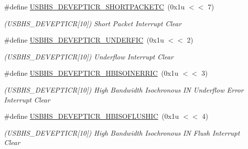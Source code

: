 \begin{DoxyCompactItemize}
\mbox{\label{group__SAMS70__USBHS_ga157a85d1247175cdabb46c823d30dcc7}} 
\#define \mbox{\hyperlink{group__SAMS70__USBHS_ga157a85d1247175cdabb46c823d30dcc7}{U\+S\+B\+H\+S\+\_\+\+D\+E\+V\+E\+P\+T\+I\+C\+R\+\_\+\+S\+H\+O\+R\+T\+P\+A\+C\+K\+E\+TC}}~(0x1u $<$$<$ 7)
\begin{DoxyCompactList}\small\item\em (U\+S\+B\+H\+S\+\_\+\+D\+E\+V\+E\+P\+T\+I\+CR\mbox{[}10\mbox{]}) Short Packet Interrupt Clear \end{DoxyCompactList}\item 
\mbox{\label{group__SAMS70__USBHS_ga62fa84e30ca3a2de864ec235f99b1fb2}} 
\#define \mbox{\hyperlink{group__SAMS70__USBHS_ga62fa84e30ca3a2de864ec235f99b1fb2}{U\+S\+B\+H\+S\+\_\+\+D\+E\+V\+E\+P\+T\+I\+C\+R\+\_\+\+U\+N\+D\+E\+R\+F\+IC}}~(0x1u $<$$<$ 2)
\begin{DoxyCompactList}\small\item\em (U\+S\+B\+H\+S\+\_\+\+D\+E\+V\+E\+P\+T\+I\+CR\mbox{[}10\mbox{]}) Underflow Interrupt Clear \end{DoxyCompactList}\item 
\mbox{\label{group__SAMS70__USBHS_ga545da4a14b5d0a1116acefa6b9f9ef06}} 
\#define \mbox{\hyperlink{group__SAMS70__USBHS_ga545da4a14b5d0a1116acefa6b9f9ef06}{U\+S\+B\+H\+S\+\_\+\+D\+E\+V\+E\+P\+T\+I\+C\+R\+\_\+\+H\+B\+I\+S\+O\+I\+N\+E\+R\+R\+IC}}~(0x1u $<$$<$ 3)
\begin{DoxyCompactList}\small\item\em (U\+S\+B\+H\+S\+\_\+\+D\+E\+V\+E\+P\+T\+I\+CR\mbox{[}10\mbox{]}) High Bandwidth Isochronous IN Underflow Error Interrupt Clear \end{DoxyCompactList}\item 
\mbox{\label{group__SAMS70__USBHS_gaf7a950038e2e41020695d1a43f25593b}} 
\#define \mbox{\hyperlink{group__SAMS70__USBHS_gaf7a950038e2e41020695d1a43f25593b}{U\+S\+B\+H\+S\+\_\+\+D\+E\+V\+E\+P\+T\+I\+C\+R\+\_\+\+H\+B\+I\+S\+O\+F\+L\+U\+S\+H\+IC}}~(0x1u $<$$<$ 4)
\begin{DoxyCompactList}\small\item\em (U\+S\+B\+H\+S\+\_\+\+D\+E\+V\+E\+P\+T\+I\+CR\mbox{[}10\mbox{]}) High Bandwidth Isochronous IN Flush Interrupt Clear \end{DoxyCompactList}\item 

\end{DoxyCompactItemize}
